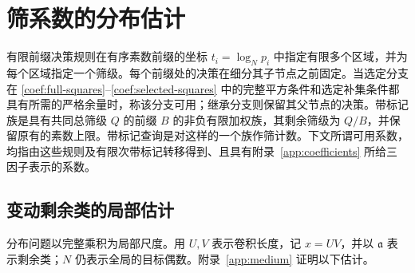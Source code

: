 \section{筛系数的分布估计}
\label{sec:current-distribution}

\begin{definition}
有限前缀决策规则在有序素数前缀的坐标 $t_i=\log_Np_i$ 中指定有限多个区域，并为每个区域指定一个筛级。每个前缀处的决策在细分其子节点之前固定。当选定分支在 \eqref{coef:full-squares}--\eqref{coef:selected-squares} 中的完整平方条件和选定补集条件都具有所需的严格余量时，称该分支可用；继承分支则保留其父节点的决策。带标记族是具有共同总筛级 $Q$ 的前缀 $B$ 的非负有限加权族，其剩余筛级为 $Q/B$，并保留原有的素数上限。带标记查询是对这样的一个族作筛计数。下文所谓可用系数，均指由这些规则及有限次带标记转移得到、且具有附录~\ref{app:coefficients} 所给三因子表示的系数。
\end{definition}

\subsection{变动剩余类的局部估计}

分布问题以完整乘积为局部尺度。用 $U,V$ 表示卷积长度，记 $x=UV$，并以 $\mathfrak a$ 表示剩余类；$N$ 仍表示全局的目标偶数。附录~\ref{app:medium} 证明以下估计。

